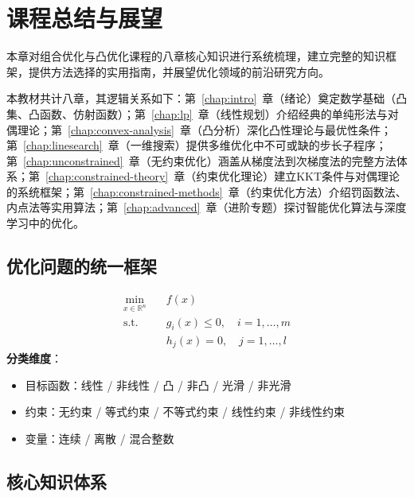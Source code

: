 \chapter{课程总结与展望}\label{chap:summary}

本章对组合优化与凸优化课程的八章核心知识进行系统梳理，建立完整的知识框架，提供方法选择的实用指南，并展望优化领域的前沿研究方向。

\begin{notebox}[章节内容速查]
本教材共计八章，其逻辑关系如下：第~\ref{chap:intro}~章（绪论）奠定数学基础（凸集、凸函数、仿射函数）；第~\ref{chap:lp}~章（线性规划）介绍经典的单纯形法与对偶理论；第~\ref{chap:convex-analysis}~章（凸分析）深化凸性理论与最优性条件；第~\ref{chap:linesearch}~章（一维搜索）提供多维优化中不可或缺的步长子程序；第~\ref{chap:unconstrained}~章（无约束优化）涵盖从梯度法到次梯度法的完整方法体系；第~\ref{chap:constrained-theory}~章（约束优化理论）建立KKT条件与对偶理论的系统框架；第~\ref{chap:constrained-methods}~章（约束优化方法）介绍罚函数法、内点法等实用算法；第~\ref{chap:advanced}~章（进阶专题）探讨智能优化算法与深度学习中的优化。
\end{notebox}

\section{优化问题的统一框架}

\begin{conceptbox}[最优化问题的一般形式]
\[
\begin{aligned}
\min_{x \in \mathbb{R}^n} \quad & f(x) \\
\text{s.t.} \quad & g_i(x) \leq 0, \quad i = 1, \ldots, m \\
& h_j(x) = 0, \quad j = 1, \ldots, l
\end{aligned}
\]
\textbf{分类维度}：
\begin{itemize}
    \item 目标函数：线性 / 非线性 / 凸 / 非凸 / 光滑 / 非光滑
    \item 约束：无约束 / 等式约束 / 不等式约束 / 线性约束 / 非线性约束
    \item 变量：连续 / 离散 / 混合整数
\end{itemize}
\end{conceptbox}

\section{核心知识体系}

